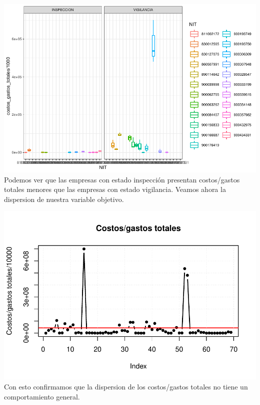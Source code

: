 \documentclass[
  11pt,
  a4paper,
]{book}
\newenvironment{Shaded}{\begin{snugshade}}{\end{snugshade}}
\newcommand{\DataTypeTok}[1]{\textcolor[rgb]{0.13,0.29,0.53}{#1}}
\newcommand{\DecValTok}[1]{\textcolor[rgb]{0.00,0.00,0.81}{#1}}
\newcommand{\KeywordTok}[1]{\textcolor[rgb]{0.13,0.29,0.53}{\textbf{#1}}}
\newcommand{\NormalTok}[1]{#1}
\newcommand{\OperatorTok}[1]{\textcolor[rgb]{0.81,0.36,0.00}{\textbf{#1}}}
\newcommand{\StringTok}[1]{\textcolor[rgb]{0.31,0.60,0.02}{#1}}
\begin{document}
\includegraphics{index_files/figure-latex/unnamed-chunk-55-1.pdf}
Podemos ver que las empresas con estado inspección presentan
costos/gastos totales menores que las empresas con estado vigilancia.
Veamos ahora la dispersion de nuestra variable objetivo.

\begin{Shaded}
\end{Shaded}

\includegraphics{index_files/figure-latex/unnamed-chunk-56-1.pdf} Con
esto confirmamos que la dispersion de los costos/gastos totales no tiene
un comportamiento general.
\end{document}
